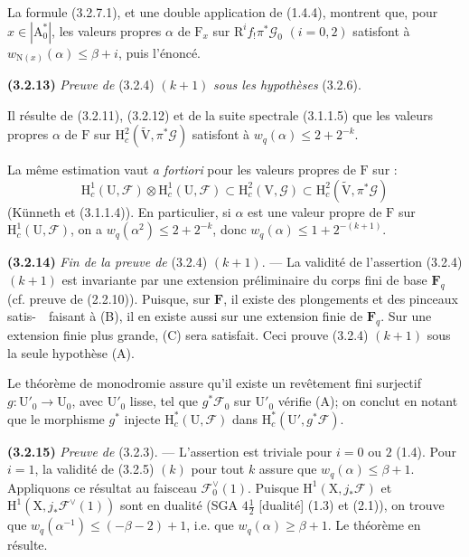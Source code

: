 \documentclass[11pt,leqno]{article}
\newcommand{\Page}[1]{\ifvmode\noindent\else\unskip\ \fi{\footnotesize\textcolor{gray}{[p.\,#1]}}\ \ignorespaces}
\begin{document}
La formule (3.2.7.1), et une double application de (1.4.4), montrent que, pour \(x\in|\mathrm{A}_0^*|\), les valeurs propres \(\alpha\) de \(\mathrm{F}_x\) sur \(\mathrm{R}^if_!\pi^*\mathscr{G}_0\) \((i=0,2)\) satisfont à \(w_{\mathrm{N}(x)}(\alpha)\leq\beta+i\), puis l’énoncé.

\textbf{(3.2.13)} \textit{Preuve de} (3.2.4) \((k+1)\) \textit{sous les hypothèses} (3.2.6).

Il résulte de (3.2.11), (3.2.12) et de la suite spectrale (3.1.1.5) que les valeurs propres \(\alpha\) de \(\mathrm{F}\) sur \(\mathrm{H}_c^2(\widetilde{\mathrm{V}},\pi^*\mathscr{G})\) satisfont à \(w_q(\alpha)\leq2+2^{-k}\).

La même estimation vaut \textit{a fortiori} pour les valeurs propres de \(\mathrm{F}\) sur :
\[
\mathrm{H}_c^1(\mathrm{U},\mathscr{F})\otimes
\mathrm{H}_c^1(\mathrm{U},\mathscr{F})
\subset\mathrm{H}_c^2(\mathrm{V},\mathscr{G})
\subset\mathrm{H}_c^2(\widetilde{\mathrm{V}},\pi^*\mathscr{G})
\]
(Künneth et (3.1.1.4)). En particulier, si \(\alpha\) est une valeur propre de \(\mathrm{F}\) sur \(\mathrm{H}_c^1(\mathrm{U},\mathscr{F})\), on a \(w_q(\alpha^2)\leq2+2^{-k}\), donc \(w_q(\alpha)\leq1+2^{-(k+1)}\).

\textbf{(3.2.14)} \textit{Fin de la preuve de} (3.2.4) \((k+1)\). — La validité de l’assertion (3.2.4) \((k+1)\) est invariante par une extension préliminaire du corps fini de base \(\mathbf{F}_q\) (cf. preuve de (2.2.10)). Puisque, sur \(\mathbf{F}\), il existe des plongements et des pinceaux satis-\Page{204}faisant à (B), il en existe aussi sur une extension finie de \(\mathbf{F}_q\). Sur une extension finie plus grande, (C) sera satisfait. Ceci prouve (3.2.4) \((k+1)\) sous la seule hypothèse (A).

Le théorème de monodromie assure qu’il existe un revêtement fini surjectif \(g:\mathrm{U}'_0\to\mathrm{U}_0\), avec \(\mathrm{U}'_0\) lisse, tel que \(g^*\mathscr{F}_0\) sur \(\mathrm{U}'_0\) vérifie (A); on conclut en notant que le morphisme \(g^*\) injecte \(\mathrm{H}_c^*(\mathrm{U},\mathscr{F})\) dans \(\mathrm{H}_c^*(\mathrm{U}',g^*\mathscr{F})\).

\textbf{(3.2.15)} \textit{Preuve de} (3.2.3). — L’assertion est triviale pour \(i=0\) ou \(2\) (1.4). Pour \(i=1\), la validité de (3.2.5) \((k)\) pour tout \(k\) assure que \(w_q(\alpha)\leq\beta+1\). Appliquons ce résultat au faisceau \(\mathscr{F}_0^\vee(1)\). Puisque \(\mathrm{H}^1(\mathrm{X},j_*\mathscr{F})\) et \(\mathrm{H}^1(\mathrm{X},j_*\mathscr{F}^\vee(1))\) sont en dualité (SGA \(4\frac{1}{2}\) [dualité] (1.3) et (2.1)), on trouve que \(w_q(\alpha^{-1})\leq(-\beta-2)+1\), i.e. que \(w_q(\alpha)\geq\beta+1\). Le théorème en résulte.
\end{document}
